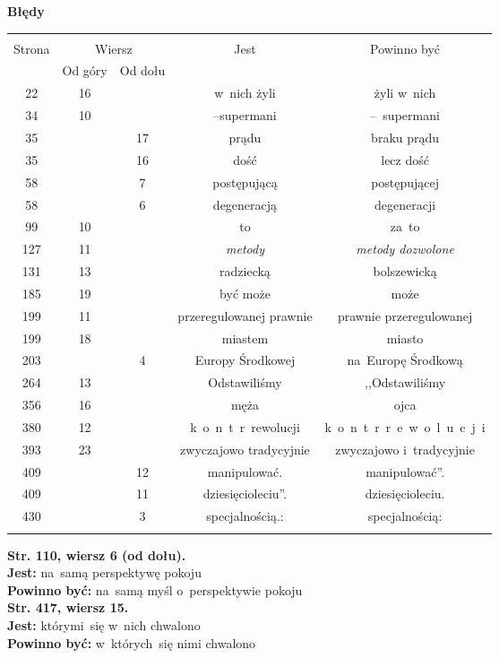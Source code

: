 \documentclass[a4paper,11pt]{article}
\newcommand{\tb}{\textbf}
\newcommand{\noi}{\noindent}
\newcommand{\Center}[1]{\begin{center} #1 \end{center}}
\newcommand{\CenterTB}[1]{\Center{\tb{#1}}}
\newcommand{\StrWg}[2]{\tb{Str. #1, wiersz #2.}}
\newcommand{\StrWd}[2]{\tb{Str. #1, wiersz #2 (od dołu).}}
\newcommand{\Jest}{\tb{Jest: }}
\newcommand{\Pow}{\tb{Powinno być: }}
\begin{document}
\CenterTB{Błędy}
\begin{center}
  \begin{tabular}{|c|c|c|c|c|}
    \hline
    & \multicolumn{2}{c|}{} & & \\
    Strona & \multicolumn{2}{c|}{Wiersz}& Jest & Powinno być \\ \cline{2-3}
    & Od góry & Od dołu &  &  \\ \hline
    22 & 16 & & w~nich żyli & żyli w~nich \\
    34 & 10 & & --supermani & --~supermani \\
    35 & & 17 & prądu & braku prądu \\
    35 & & 16 & dość & lecz dość \\
    58 & & 7 & postępującą & postępującej \\
    58 & & 6 & degeneracją & degeneracji \\
    99 & 10 & & to & za~to \\
    127 & 11 & & \emph{metody} & \emph{metody dozwolone} \\
    131 & 13 & & radziecką & bolszewicką \\
    185 & 19 & & być może & może \\
    199 & 11 & & przeregulowanej prawnie & prawnie przeregulowanej \\
    199 & 18 & & miastem & miasto \\
    203 & & 4 & Europy Środkowej & na~Europę Środkową \\
    264 & 13 & & Odstawiliśmy & ,,Odstawiliśmy \\ %
    356 & 16 & & męża & ojca \\
    380 & 12 & & k~o~n~t~r~rewolucji & k~o~n~t~r~r~e~w~o~l~u~c~j~i \\
    393 & 23 & & zwyczajowo tradycyjnie & zwyczajowo i~tradycyjnie \\
    409 & & 12 & manipulować. & manipulować''. \\
    409 & & 11 & dziesięcioleciu''. & dziesięcioleciu. \\
    430 & & 3 & specjalnością.: & specjalnością: \\
    & & & & \\ \hline
  \end{tabular}
\end{center}
\noi
\StrWd{110}{6} \\
\Jest na~samą perspektywę pokoju \\
\Pow na~samą myśl o~perspektywie pokoju \\
\StrWg{417}{15} \\
\Jest którymi~się w~nich chwalono \\
\Pow w~których~się nimi chwalono \\
\end{document}
